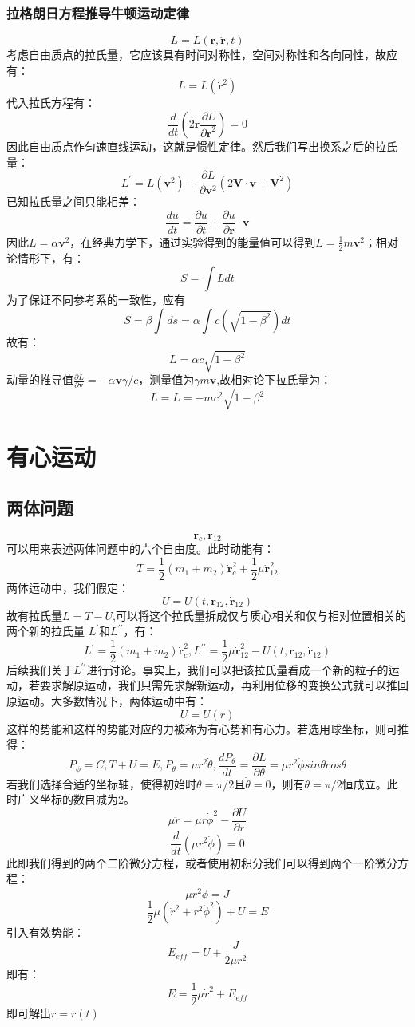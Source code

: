\documentclass[a4paper, 10pt, openany]{book}%
\begin{document}
    \subsection{拉格朗日方程推导牛顿运动定律}
    $$L=L(\textbf{r},\dot{\textbf{r}},t)$$
    考虑自由质点的拉氏量，它应该具有时间对称性，空间对称性和各向同性，故应有：
    $$L=L(\dot{\textbf{r}}^2)$$
    代入拉氏方程有：
    $$\frac{d}{dt}(2\dot{\textbf{r}}\frac{\partial L}{\partial \dot{\textbf{r}}^2})=0$$
    因此自由质点作匀速直线运动，这就是惯性定律。然后我们写出换系之后的拉氏量：
    $$L^\prime=L(\textbf{v}^2)+\frac{\partial L}{\partial \textbf{v}^2}(2\textbf{V}\cdot\textbf{v}+\textbf{V}^2)$$
    已知拉氏量之间只能相差：
    $$\frac{du}{dt}=\frac{\partial u}{\partial t}+\frac{\partial u}{\partial \textbf{r}}\cdot\textbf{v}$$
    因此$L=\alpha\textbf{v}^2$，在经典力学下，通过实验得到的能量值可以得到$L=\frac{1}{2}m\textbf{v}^2$；相对论情形下，有：
    $$S=\int Ldt$$
    为了保证不同参考系的一致性，应有
    $$S=\beta\int ds=\alpha\int c(\sqrt{1-\beta^2})dt$$
    故有：
    $$L=\alpha c \sqrt{1-\beta^2}$$
    动量的推导值$\frac{\partial L}{\partial \textbf{v}}=-\alpha \textbf{v}\gamma/c$，测量值为$\gamma m \textbf{v}$,故相对论下拉氏量为：
    $$L=L=-m c^2 \sqrt{1-\beta^2}$$
    \chapter{有心运动}
    \section{两体问题}
    $$\textbf{r}_c,\textbf{r}_{12}$$
    可以用来表述两体问题中的六个自由度。此时动能有：
    $$T=\frac{1}{2}(m_1+m_2)\dot{\textbf{r}}^2_c+\frac{1}{2}\mu \dot{\textbf{r}}^2_{12}$$
    两体运动中，我们假定：
    $$U=U(t,\textbf{r}_{12},\dot{\textbf{r}}_{12})$$
    故有拉氏量$L=T-U$,可以将这个拉氏量拆成仅与质心相关和仅与相对位置相关的两个新的拉氏量 $L^\prime$和$L^{\prime\prime}$，有：
    $$L^\prime=\frac{1}{2}(m_1+m_2)\dot{\textbf{r}}^2_c,L^{\prime\prime}=\frac{1}{2}\mu \dot{\textbf{r}}^2_{12}-U(t,\textbf{r}_{12},\dot{\textbf{r}}_{12})$$
    后续我们关于$L^{\prime\prime}$进行讨论。事实上，我们可以把该拉氏量看成一个新的粒子的运动，若要求解原运动，我们只需先求解新运动，再利用位移的变换公式就可以推回原运动。大多数情况下，两体运动中有：
    $$U=U(r)$$
    这样的势能和这样的势能对应的力被称为有心势和有心力。若选用球坐标，则可推得：
    $$P_\phi=C,T+U=E,P_\theta=\mu {r}^2\dot{\theta},\frac{dP_\theta}{dt}=\frac{\partial L}{\partial {\theta}}=\mu {r}^2\dot{\phi}sin\theta cos\theta$$
    若我们选择合适的坐标轴，使得初始时$\theta=\pi/2$且$\dot{\theta}=0$，则有$\theta=\pi/2$恒成立。此时广义坐标的数目减为2。
    $$\mu\ddot{r}=\mu r\dot{\phi}^2-\frac{\partial U}{\partial r}$$
    $$\frac{d}{dt}(\mu r^2\dot{\phi})=0$$
    此即我们得到的两个二阶微分方程，或者使用初积分我们可以得到两个一阶微分方程：
    $$\mu r^2\dot{\phi}=J$$
    $$\frac{1}{2}\mu (\dot{r}^2+r^2\dot{\phi}^2)+U=E$$
    引入有效势能：
    $$E_{eff}=U+\frac{J}{2\mu r^2}$$
    即有：
    $$E=\frac{1}{2}\mu \dot{r}^2+E_{eff}$$
    即可解出$r=r(t)$
\end{document}
